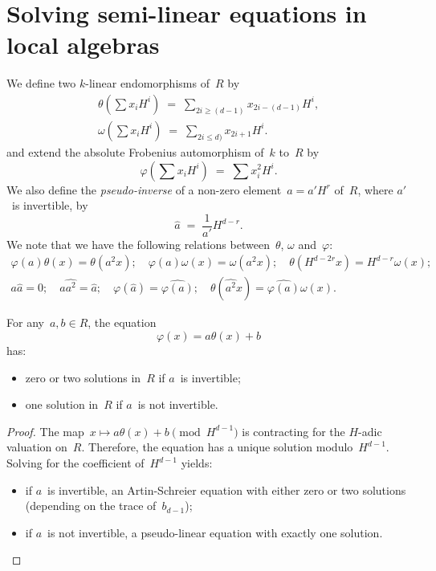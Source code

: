 \documentclass{llncs}
\begin{document}
\section{Solving semi-linear equations in local algebras}
We define two $k$-linear endomorphisms of~$R$
by
\begin{gather*}
θ(∑ x_i H^i) \;=\; ∑_{2i ≥ (d-1)} x_{2i-(d-1)} H^i,\\
ω(∑ x_i H^i) \;=\; ∑_{2i ≤ d)} x_{2i+1} H^{i}.
\end{gather*}
and extend the absolute Frobenius automorphism of~$k$ to~$R$ by
\begin{equation}
φ(∑ x_i H^i) \;=\; ∑ x_{i}^2 H^i.
\end{equation}
We also define the \emph{pseudo-inverse} of a non-zero element~$a = a'
H^r$ of~$R$, where $a'$~is invertible, by
\begin{equation}\label{eq:pseudo-inv}
\widehat{a} \;=\; \frac{1}{a'} H^{d-r}.
\end{equation}
We note that we have the following relations between~$θ$, $ω$ and~$φ$:
\begin{gather*}\label{eq:theta-omega}
φ(a) θ(x) = θ(a^2 x); \quad
φ(a) ω(x) = ω(a^2 x); \quad
θ(H^{d-2r} x) = H^{d-r} ω(x);\\
a \widehat{a} = 0; \quad a \widehat{a^2} = \widehat{a};\quad
φ(\widehat{a}) = \widehat{φ(a)};\quad
θ(\widehat{a^2} x) = \widehat{φ(a)} ω(x).
\end{gather*}


\begin{proposition}\label{prop:contracting}
For any~$a, b ∈ R$, the equation
\begin{equation}
φ(x) = a θ(x) + b
\end{equation}
has:
\begin{itemize}
\item zero or two solutions in~$R$ if $a$~is invertible;
\item one solution in~$R$ if $a$~is not invertible.
\end{itemize}
\end{proposition}


\begin{proof}
The map~$x ↦ a θ(x) + b \pmod{H^{d-1}}$ is contracting for the $H$-adic
valuation on~$R$. Therefore, the equation has a unique solution
modulo~$H^{d-1}$. Solving for the coefficient of~$H^{d-1}$ yields:
\begin{itemize}
\item if $a$~is invertible, an Artin-Schreier equation with either zero or
two solutions (depending on the trace of~$b_{d-1}$);
\item if $a$~is not invertible, a pseudo-linear equation with exactly one
solution.
\end{itemize}
\end{proof}
\end{document}
